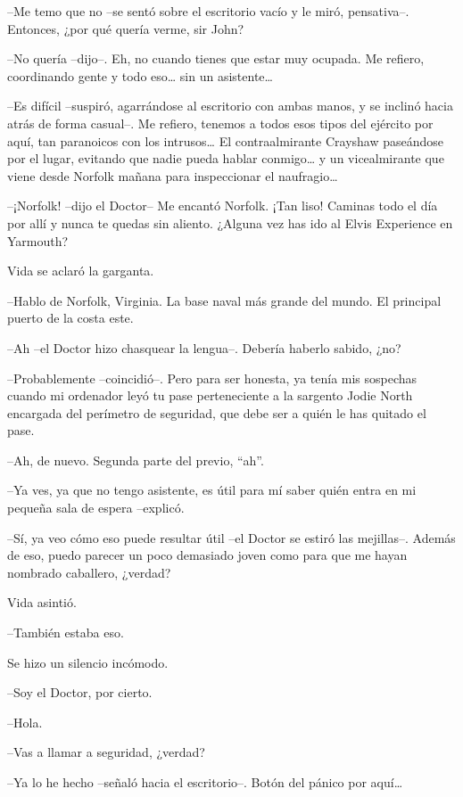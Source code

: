 {--Me temo que no --se sentó sobre el escritorio vacío y le miró,
pensativa--. Entonces, ¿por qué quería verme, sir John?}

{--No quería --dijo--. Eh, no cuando tienes que estar muy ocupada. Me
 refiero, coordinando gente y todo eso\ldots{} sin un asistente\ldots{}}

{--Es difícil --suspiró, agarrándose al escritorio con ambas manos, y se
 inclinó hacia atrás de forma casual--. Me refiero, tenemos a todos esos
 tipos del ejército por aquí, tan paranoicos con los intrusos\ldots{} El
 contraalmirante Crayshaw paseándose por el lugar, evitando que nadie
 pueda hablar conmigo\ldots{} y un vicealmirante que viene desde Norfolk
 mañana para inspeccionar el naufragio\ldots{}}

{--¡Norfolk! --dijo el Doctor-- Me encantó Norfolk. ¡Tan liso! Caminas
 todo el día por allí y nunca te quedas sin aliento. ¿Alguna vez has ido
al Elvis Experience en Yarmouth?}

{Vida se aclaró la garganta.}

{--Hablo de Norfolk, Virginia. La base naval más grande del mundo. El
principal puerto de la costa este.}

{--Ah --el Doctor hizo chasquear la lengua--. Debería haberlo sabido,
¿no?}

{--Probablemente --coincidió--. Pero para ser honesta, ya tenía mis
 sospechas cuando mi ordenador leyó tu pase perteneciente a la sargento
 Jodie North encargada del perímetro de seguridad, que debe ser a quién
le has quitado el pase.}

{--Ah, de nuevo. Segunda parte del previo, ``ah''.}

{--Ya ves, ya que no tengo asistente, es útil para mí saber quién entra
en mi pequeña sala de espera --explicó.}

{--Sí, ya veo cómo eso puede resultar útil --el Doctor se estiró las
 mejillas--. Además de eso, puedo parecer un poco demasiado joven como
para que me hayan nombrado caballero, ¿verdad?}

{Vida asintió.}

{--También estaba eso.}

{Se hizo un silencio incómodo.}

{--Soy el Doctor, por cierto.}

{--Hola.}

{--Vas a llamar a seguridad, ¿verdad?}

{--Ya lo he hecho --señaló hacia el escritorio--. Botón del pánico por
 aquí\ldots{}}

